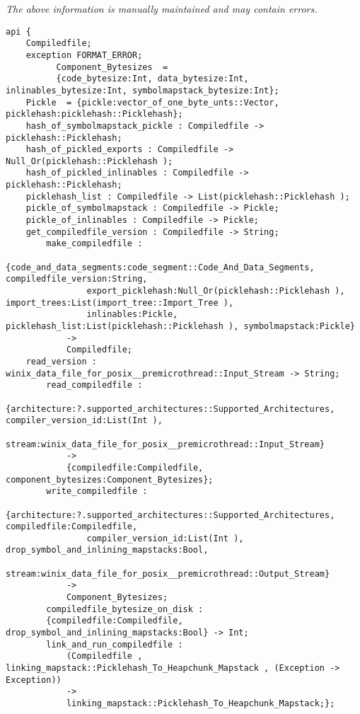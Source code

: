 \label{api:Compiledfile}

{\tiny \it The above information is manually maintained and may contain errors.}
\begin{verbatim}
api {
    Compiledfile;
    exception FORMAT_ERROR;
          Component_Bytesizes  =
          {code_bytesize:Int, data_bytesize:Int, inlinables_bytesize:Int, symbolmapstack_bytesize:Int};
    Pickle  = {pickle:vector_of_one_byte_unts::Vector, picklehash:picklehash::Picklehash};
    hash_of_symbolmapstack_pickle : Compiledfile -> picklehash::Picklehash;
    hash_of_pickled_exports : Compiledfile -> Null_Or(picklehash::Picklehash );
    hash_of_pickled_inlinables : Compiledfile -> picklehash::Picklehash;
    picklehash_list : Compiledfile -> List(picklehash::Picklehash );
    pickle_of_symbolmapstack : Compiledfile -> Pickle;
    pickle_of_inlinables : Compiledfile -> Pickle;
    get_compiledfile_version : Compiledfile -> String;
        make_compiledfile :
                {code_and_data_segments:code_segment::Code_And_Data_Segments, compiledfile_version:String,
                export_picklehash:Null_Or(picklehash::Picklehash ), import_trees:List(import_tree::Import_Tree ),
                inlinables:Pickle, picklehash_list:List(picklehash::Picklehash ), symbolmapstack:Pickle}
            ->
            Compiledfile;
    read_version : winix_data_file_for_posix__premicrothread::Input_Stream -> String;
        read_compiledfile :
                {architecture:?.supported_architectures::Supported_Architectures, compiler_version_id:List(Int ),
                stream:winix_data_file_for_posix__premicrothread::Input_Stream}
            ->
            {compiledfile:Compiledfile, component_bytesizes:Component_Bytesizes};
        write_compiledfile :
                {architecture:?.supported_architectures::Supported_Architectures, compiledfile:Compiledfile,
                compiler_version_id:List(Int ), drop_symbol_and_inlining_mapstacks:Bool,
                stream:winix_data_file_for_posix__premicrothread::Output_Stream}
            ->
            Component_Bytesizes;
        compiledfile_bytesize_on_disk :
        {compiledfile:Compiledfile, drop_symbol_and_inlining_mapstacks:Bool} -> Int;
        link_and_run_compiledfile :
            (Compiledfile , linking_mapstack::Picklehash_To_Heapchunk_Mapstack , (Exception -> Exception))
            ->
            linking_mapstack::Picklehash_To_Heapchunk_Mapstack;};
\end{verbatim}
